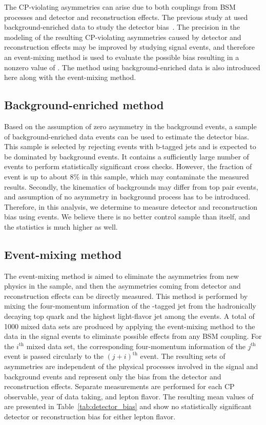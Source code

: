 The CP-violating asymmetries can arise due to both couplings from BSM processes and detector and reconstruction effects.
The previous study at \oldTeV used background-enriched data to study the detector bias~\cite{CPVtop:CMSresult}.
The precision in the modeling of the resulting CP-violating asymmetries caused by detector and reconstruction effects may be improved by studying signal events, and therefore an event-mixing method is used to evaluate the possible bias resulting in a nonzero value of \Acpprime.
The method using background-enriched data is also introduced here along with the event-mixing method.

\subsection{Background-enriched method}
Based on the assumption of zero asymmetry in the background events, a sample of background-enriched data events can be used to estimate the detector bias.
This sample is selected by rejecting events with b-tagged jets and is expected to be dominated by background events.
It contains a sufficiently large number of events to perform statistically significant cross checks.
However, the fraction of \ttbar event is up to about $8\%$ in this sample, which may contaminate the measured results.
Secondly, the kinematics of backgrounds may differ from top pair events, and assumption of no asymmetry in background process has to be introduced.
Therefore, in this analysis, we determine to measure detector and reconstruction bias using \ttbar events.
We believe there is no better control sample than \ttbar itself, and the statistics is much higher as well.

\subsection{Event-mixing method}
The event-mixing method is aimed to eliminate the asymmetries from new physics in the sample, and then the asymmetries coming from detector and reconstruction effects can be directly measured. 
This method is performed by mixing the four-momentum information of the \PQb-tagged jet from the hadronically decaying top quark and the highest \PT light-flavor jet among the events.
A total of 1000 mixed data sets are produced by applying the event-mixing method to the data in the signal events to eliminate possible effects from any BSM coupling.
For the $i^{\text{th}}$ mixed data set, the corresponding four-momentum information of the $j^{\text{th}}$ event is passed circularly to the $(j+i)^{\text{th}}$ event.
The resulting sets of asymmetries are independent of the physical processes involved in the signal and background events and represent only the bias from the detector and reconstruction effects.
Separate measurements are performed for each CP observable, year of data taking, and lepton flavor.
The resulting mean values of \Acpprime are presented in Table~\ref{tab:detector_bias} and show no statistically significant detector or reconstruction bias for either lepton flavor.

